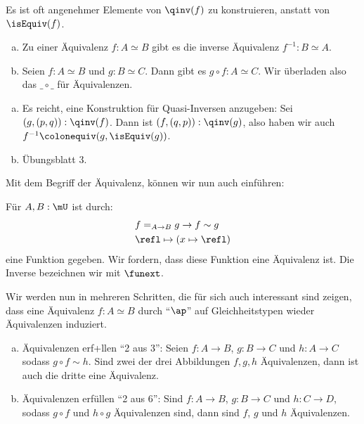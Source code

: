 Es ist oft angenehmer Elemente von $\qinv(f)$ zu konstruieren, anstatt von $\isEquiv(f)$.

\begin{lemma}
  \begin{enumerate}[(a)]
  \item Zu einer Äquivalenz $f:A\simeq B$ gibt es die inverse Äquivalenz $f^{-1}:B\simeq A$.
  \item Seien $f:A\simeq B$ und $g:B\simeq C$. Dann gibt es $g\circ f:A\simeq C$. Wir überladen also das $\_\circ\_$ für Äquivalenzen.
  \end{enumerate}
\end{lemma}

\begin{beweis}
  \begin{enumerate}[(a)]
  \item Es reicht, eine Konstruktion für Quasi-Inversen anzugeben: Sei $(g,(p,q)):\qinv(f)$.
    Dann ist $(f,(q,p)):\qinv(g)$, also haben wir auch $f^{-1}\colonequiv (g,\isEquiv(g))$.
  \item Übungsblatt 3.
  \end{enumerate}
\end{beweis}

Mit dem Begriff der Äquivalenz, können wir nun auch  einführen:

\begin{axiom}
  Für $A,B:\mU$ ist durch:
  \begin{align*}
    &f=_{A\to B}g \to f\sim g \\
    &\refl\mapsto (x\mapsto \refl)
  \end{align*}
  eine Funktion gegeben. Wir fordern, dass diese Funktion eine Äquivalenz ist.
  Die Inverse bezeichnen wir mit $\funext$\index{$\funext$}.
\end{axiom}

Wir werden nun in mehreren Schritten, die für sich auch interessant sind zeigen,
dass eine Äquivalenz $f:A\simeq B$ durch ``$\ap$'' auf Gleichheitstypen wieder Äquivalenzen induziert.

\begin{lemma}
  \begin{enumerate}[(a)]
  \item Äquivalenzen erf+llen ``2 aus 3'':
    Seien $f:A\to B$, $g:B\to C$ und $h:A\to C$
    sodass $g\circ f\sim h$.
    Sind zwei der drei Abbildungen $f,g,h$ Äquivalenzen, dann ist auch die dritte eine Äquivalenz.
  \item Äquivalenzen erfüllen ``2 aus 6'':
    Sind $f:A\to B$, $g:B\to C$ und $h:C\to D$, sodass $g\circ f$ und $h\circ g$ Äquivalenzen sind,
    dann sind $f$, $g$ und $h$ Äquivalenzen.
  \end{enumerate}
\end{lemma}

